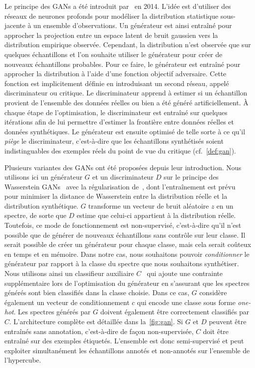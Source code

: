 Le principe des \glspl{GAN} a été introduit par~\citet{goodfellow_generative_2014} en 2014. L'idée est d'utiliser des réseaux de neurones profonds pour modéliser la distribution statistique sous-jacente à un ensemble d'observations. Un générateur est ainsi entraîné pour approcher la projection entre un espace latent de bruit gaussien vers la distribution empirique observée. Cependant, la distribution n'est observée que sur quelques échantillons et l'on souhaite utiliser le générateur pour créer de nouveaux échantillons probables. Pour ce faire, le générateur est entraîné pour approcher la distribution à l'aide d'une fonction objectif adversaire. Cette fonction est implicitement définie en introduisant un second réseau, appelé discriminateur ou critique. Le discriminateur apprend à estimer si un échantillon provient de l'ensemble des données réelles ou bien a été généré artificiellement. À chaque étape de l'optimisation, le discriminateur est entraîné sur quelques itérations afin de lui permettre d'estimer la frontière entre données réelles et données synthétiques. Le générateur est ensuite optimisé de telle sorte à ce qu'il \emph{piège} le discriminateur, c'est-à-dire que les échantillons synthétisés soient indistinguables des exemples réels du point de vue du critique (cf.~\cref{def:gan}).

Plusieurs variantes des \glspl{GAN} ont été proposées depuis leur introduction. Nous utilisons ici un générateur $G$ et un discriminateur $D$ sur le principe des Wasserstein \glspl{GAN}~\cite{arjovsky_wasserstein_2017} avec la régularisation de~\citet{gulrajani_improved_2017}, dont l'entraînement est prévu pour minimiser la distance de Wasserstein entre la distribution réelle et la distribution synthétique. $G$ transforme un vecteur de bruit aléatoire $z$ en un spectre, de sorte que $D$ estime que celui-ci appartient à la distribution réelle. Toutefois, ce mode de fonctionnement est non-supervisé, c'est-à-dire qu'il n'est possible que de générer de nouveaux échantillons sans contrôle sur leur classe. Il serait possible de créer un générateur pour chaque classe, mais cela serait coûteux en temps et en mémoire. Dans notre cas, nous souhaitons pouvoir \emph{conditionner} le générateur par rapport à la classe du spectre que nous souhaitons synthétiser. Nous utilisons ainsi un classifieur auxiliaire $C$~\cite{odena_conditional_2017} qui ajoute une contrainte supplémentaire lors de l'optimisation du générateur en s'assurant que les spectres générés sont bien classifiés dans la classe choisie. Dans ce cas, $G$ considère également un vecteur de conditionnement $c$ qui encode une classe sous forme \emph{one-hot}. Les spectres générés par $G$ doivent également être correctement classifiés par $C$.
L'architecture complète est détaillée dans la~\cref{fig:gan}. Si $G$ et $D$ peuvent être entraînés sans annotation, c'est-à-dire de façon non-supervisée, $C$ doit être entraîné sur des exemples étiquetés. L'ensemble est donc semi-supervisé et peut exploiter simultanément les échantillons annotés et non-annotés sur l'ensemble de l'hypercube.

